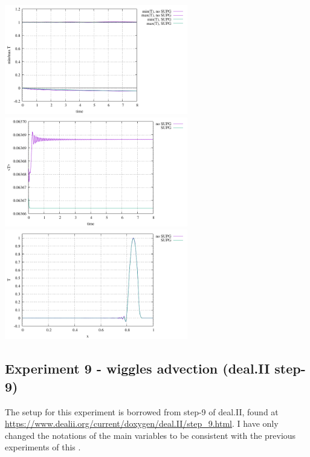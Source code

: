 \begin{center}
\includegraphics[width=8cm]{python_codes/fieldstone_43/results/experiment8/stats_T.pdf}
\includegraphics[width=8cm]{python_codes/fieldstone_43/results/experiment8/avrg_T.pdf}\\
\includegraphics[width=8cm]{python_codes/fieldstone_43/results/experiment8/diagonal}
\end{center}



\newpage
\newpage
\subsection*{Experiment 9 - wiggles advection (deal.II step-9)}

The setup for this experiment is borrowed from step-9 of deal.II, found at 
\url{https://www.dealii.org/current/doxygen/deal.II/step_9.html}.
I have only changed the notations of the main variables to be consistent 
with the previous experiments of this \stone.

